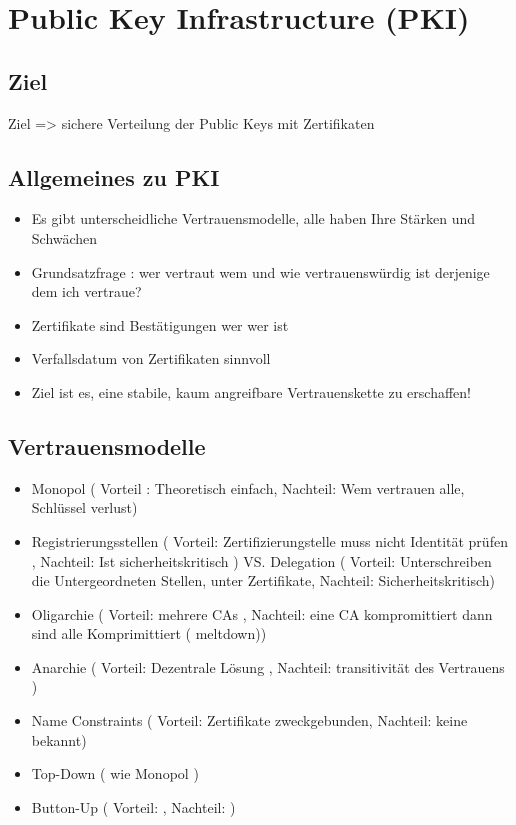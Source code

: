 \section*{Public Key Infrastructure (PKI)}
\subsection*{ Ziel}
Ziel 			=> sichere Verteilung der Public Keys mit Zertifikaten

\subsection*{Allgemeines zu PKI}
\begin{itemize}
\item Es gibt unterscheidliche Vertrauensmodelle, alle haben Ihre Stärken und Schwächen
\item Grundsatzfrage : wer vertraut wem und wie vertrauenswürdig ist derjenige dem ich vertraue?
\item Zertifikate sind Bestätigungen wer wer ist
\item Verfallsdatum von Zertifikaten sinnvoll
\item Ziel ist es, eine stabile, kaum angreifbare Vertrauenskette zu erschaffen!
\end{itemize}

\subsection*{Vertrauensmodelle}
\begin{itemize}
	\item Monopol ( Vorteil : Theoretisch einfach, Nachteil: Wem vertrauen alle, Schlüssel verlust)
	\item Registrierungsstellen ( Vorteil: Zertifizierungstelle muss nicht Identität prüfen , Nachteil: Ist sicherheitskritisch ) VS. Delegation ( Vorteil: Unterschreiben die Untergeordneten Stellen, unter Zertifikate, Nachteil: Sicherheitskritisch)
	\item Oligarchie ( Vorteil: mehrere CAs , Nachteil: eine CA kompromittiert dann sind alle Komprimittiert ( meltdown))
	\item Anarchie ( Vorteil: Dezentrale Lösung , Nachteil: transitivität des Vertrauens )
	\item Name Constraints ( Vorteil: Zertifikate zweckgebunden, Nachteil: keine bekannt)
	\item Top-Down (  wie Monopol )
	\item Button-Up ( Vorteil: , Nachteil: )
\end{itemize}


